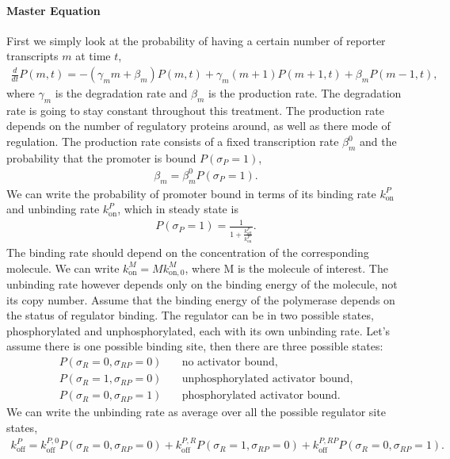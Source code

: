 \documentclass[11.5pt]{report} %
\begin{document}
\paragraph{Master Equation}
First we simply look at the probability of having a certain number of reporter transcripts $m$ at time $t$,
\begin{align}
    \frac{d}{dt}P(m, t) = - (\gamma_m m + \beta_m) P(m, t)  + \gamma_m (m+1) P(m+1, t) + \beta_m P(m-1, t),
\end{align}
where $\gamma_m$ is the degradation rate and $\beta_m$ is the production rate. The degradation rate is going to stay constant throughout this treatment. The production rate depends on the number of regulatory proteins around, as well as there mode of regulation. 
The production rate consists of a fixed transcription rate $\beta_m^0$ and the probability that the promoter is bound $P(\sigma_P=1)$,
\begin{align}
    \beta_m = \beta_m^0 P(\sigma_P=1).
\end{align}
We can write the probability of promoter bound in terms of its binding rate $k_\mathrm{on}^P$ and unbinding rate $k_\mathrm{on}^P$, which in steady state is
\begin{align}
    P(\sigma_P=1) = \frac{1}{1+\frac{k_\mathrm{off}^P}{k_\mathrm{on}^P}}.
\end{align}
The binding rate should depend on the concentration of the corresponding molecule. We can write $k_\mathrm{on}^M = Mk_{\mathrm{on},0}^M$, where M is the molecule of interest. The unbinding rate however depends only on the binding energy of the molecule, not its copy number. Assume that the binding energy of the polymerase depends on the status of regulator binding. The regulator can be in two possible states, phosphorylated and unphosphorylated, each with its own unbinding rate. Let's assume there is one possible binding site, then there are three possible states:
\begin{align*}
    P(\sigma_R=0,\sigma_{RP}=0)&\quad\text{no activator bound},\\
    P(\sigma_R=1,\sigma_{RP}=0)&\quad\text{unphosphorylated activator bound},\\
    P(\sigma_R=0,\sigma_{RP}=1)&\quad\text{phosphorylated activator bound}.
\end{align*}
We can write the unbinding rate as average over all the possible regulator site states,
\begin{align}
    k_\mathrm{off}^P = k_\mathrm{off}^{P,0}P(\sigma_R=0,\sigma_{RP}=0) + k_\mathrm{off}^{P,R}P(\sigma_R=1,\sigma_{RP}=0) + k_\mathrm{off}^{P,RP}P(\sigma_R=0,\sigma_{RP}=1).
\end{align}
\end{document}
